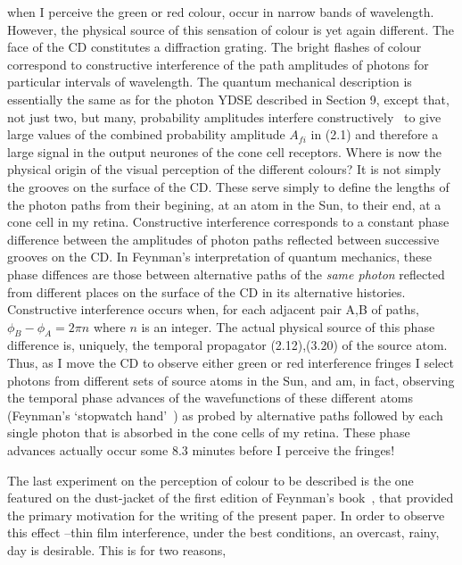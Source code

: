 \documentclass [12pt]{article}
\begin{document}
{    when I perceive the green or red colour, occur in narrow bands of wavelength. However, the physical
    source of this sensation of colour is yet again different. The face of the CD constitutes a diffraction
    grating. The bright flashes of colour correspond to constructive interference of the path amplitudes
    of photons for particular intervals of wavelength. The quantum mechanical description is essentially
    the same as for the photon YDSE described in Section 9, except that, not just two, but many, probability
    amplitudes interfere constructively~\cite{JWDG} to give large values of the combined
    probability amplitude $A_{fi}$ in (2.1) and therefore a large signal in the output
    neurones of the cone cell receptors. Where is now the physical origin of the visual perception
   of the different colours? It is not simply the grooves on the surface of the CD. These serve simply to
    define the lengths of the photon paths from their begining, at an atom in the Sun, to
    their end, at a cone cell in my retina. Constructive interference corresponds to a constant
    phase difference between the amplitudes of photon paths reflected between successive grooves on
    the CD. In Feynman's interpretation of quantum mechanics, these phase diffences are those between
    alternative paths of the {\it same photon} reflected from different places on the surface of the 
     CD in its alternative histories. Constructive interference occurs when, for each adjacent pair 
     A,B of paths, $\phi_B-\phi_A = 2 \pi n$ where $n$ is an integer. The actual physical source
    of this phase difference is, uniquely, the temporal propagator (2.12),(3.20) of the source atom.
    Thus, as I move the CD to observe either green or red interference fringes I select photons
    from different sets of source atoms in the Sun, and am, in fact, observing the temporal phase
    advances of the wavefunctions of these different atoms (Feynman's `stopwatch hand'~\cite{Feyn1}) as probed
     by alternative paths followed by each single photon that is absorbed in the cone cells
     of my retina. These phase advances actually occur some 8.3 minutes before
    I perceive the fringes!
     \par The last experiment on the perception of colour to be described is the one featured on the
     dust-jacket of the first edition of Feynman's book~\cite{Feyn1}, that provided the primary motivation
     for the writing of the present paper. In order to observe this effect --thin film interference,
     under the best conditions, an overcast, rainy, day is desirable. This is for two reasons,
}
\end{document}
